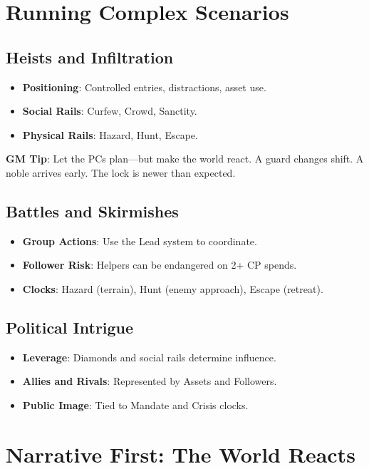 \section*{Running Complex Scenarios}

\subsection*{Heists and Infiltration}

\begin{itemize}
    \item \textbf{Positioning}: Controlled entries, distractions, asset use.
    \item \textbf{Social Rails}: Curfew, Crowd, Sanctity.
    \item \textbf{Physical Rails}: Hazard, Hunt, Escape.
\end{itemize}

\textbf{GM Tip}: Let the PCs plan—but make the world react. A guard changes shift. A noble arrives early. The lock is newer than expected.

\subsection*{Battles and Skirmishes}

\begin{itemize}
    \item \textbf{Group Actions}: Use the Lead system to coordinate.
    \item \textbf{Follower Risk}: Helpers can be endangered on 2+ CP spends.
    \item \textbf{Clocks}: Hazard (terrain), Hunt (enemy approach), Escape (retreat).
\end{itemize}

\subsection*{Political Intrigue}

\begin{itemize}
    \item \textbf{Leverage}: Diamonds and social rails determine influence.
    \item \textbf{Allies and Rivals}: Represented by Assets and Followers.
    \item \textbf{Public Image}: Tied to Mandate and Crisis clocks.
\end{itemize}

\section*{Narrative First: The World Reacts}

